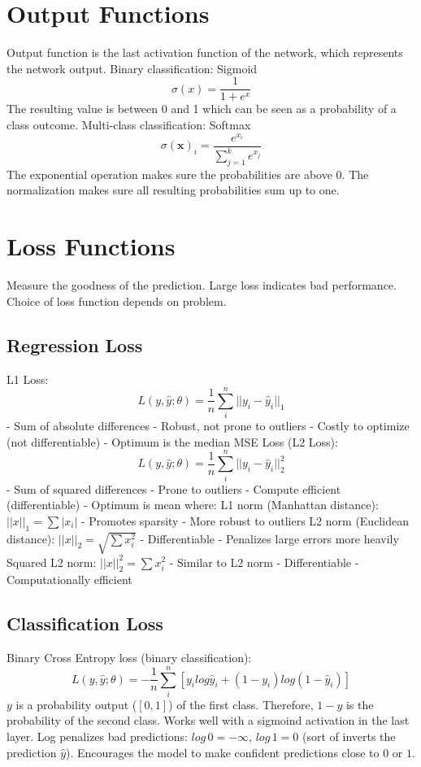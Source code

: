 \documentclass{scrartcl}
\begin{document}
\section*{Output Functions}
Output function is the last activation function of the network, which represents the network output.
Binary classification: Sigmoid
$$\sigma (x) = \frac{1}{1 + e^{x}}$$
The resulting value is between 0 and 1 which can be seen as a probability of a class outcome.
Multi-class classification: Softmax
$$\sigma (\mathbf{x})_i = \frac{e^{x_i}}{\sum_{j=1}^{k} e^{x_j}}$$
The exponential operation makes sure the probabilities are above 0. The normalization makes sure all resulting probabilities sum up to one.


\section*{Loss Functions}
Measure the goodness of the prediction.
Large loss indicates bad performance.
Choice of loss function depends on problem.

\subsection*{Regression Loss}
L1 Loss:
$$L(y, \hat{y}; \theta) = \frac{1}{n} \sum_{i}^{n} ||y_i - \hat{y}_i ||_1$$
- Sum of absolute differences
- Robust, not prone to outliers
- Costly to optimize (not differentiable)
- Optimum is the median
MSE Loss (L2 Loss):
$$L(y, \hat{y}; \theta) = \frac{1}{n} \sum_{i}^{n} ||y_i - \hat{y}_i ||_2^2$$
- Sum of squared differences
- Prone to outliers
- Compute efficient (differentiable)
- Optimum is mean
where:
L1 norm (Manhattan distance): $||x||_1 = \sum |x_i|$
- Promotes sparsity
- More robust to outliers
L2 norm (Euclidean distance): $||x||_2 = \sqrt{\sum x^2_i}$
- Differentiable
- Penalizes large errors more heavily
Squared L2 norm: $||x||^2_2 = \sum x^2_i$
- Similar to L2 norm
- Differentiable
- Computationally efficient

\subsection*{Classification Loss}
Binary Cross Entropy loss (binary classification):
$$L(y, \hat{y}; \theta) = - \frac{1}{n} \sum_{i}^{n} [y_i log \hat{y}_i + (1 - y_i) log(1 - \hat{y}_i)] $$
$y$ is a probability output ($[0,1]$) of the first class. Therefore, $1 - y$ is the probability of the second class. Works well with a sigmoind activation in the last layer.
Log penalizes bad predictions: $log \, 0 = - \infty$, $log \, 1 = 0$ (sort of inverts the prediction $\hat{y}$).
Encourages the model to make confident predictions close to $0$ or $1$.
\end{document}
